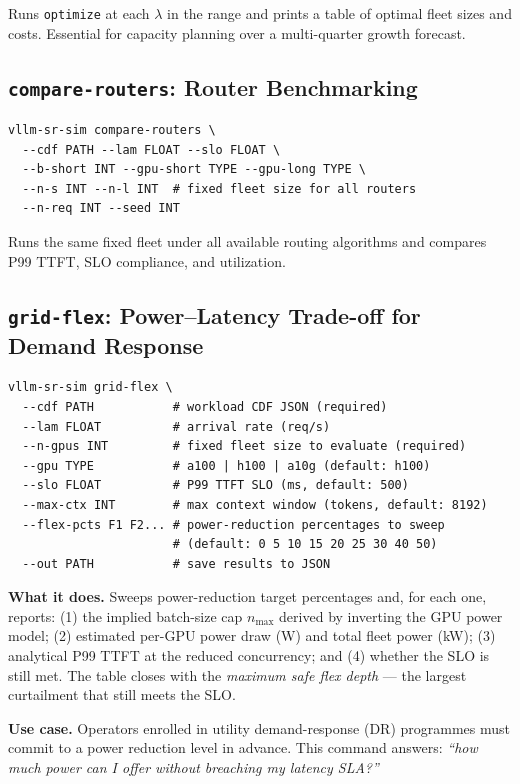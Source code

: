 \documentclass[11pt,a4paper]{article}
\begin{document}
Runs \texttt{optimize} at each $\lambda$ in the range and prints a
table of optimal fleet sizes and costs.  Essential for capacity
planning over a multi-quarter growth forecast.

\subsection{\texttt{compare-routers}: Router Benchmarking}

\begin{lstlisting}[style=shell]
vllm-sr-sim compare-routers \
  --cdf PATH --lam FLOAT --slo FLOAT \
  --b-short INT --gpu-short TYPE --gpu-long TYPE \
  --n-s INT --n-l INT  # fixed fleet size for all routers
  --n-req INT --seed INT
\end{lstlisting}

Runs the same fixed fleet under all available routing algorithms
and compares P99 TTFT, SLO compliance, and utilization.

\subsection{\texttt{grid-flex}: Power–Latency Trade-off for Demand Response}
\label{sec:cli-grid-flex}

\begin{lstlisting}[style=shell]
vllm-sr-sim grid-flex \
  --cdf PATH           # workload CDF JSON (required)
  --lam FLOAT          # arrival rate (req/s)
  --n-gpus INT         # fixed fleet size to evaluate (required)
  --gpu TYPE           # a100 | h100 | a10g (default: h100)
  --slo FLOAT          # P99 TTFT SLO (ms, default: 500)
  --max-ctx INT        # max context window (tokens, default: 8192)
  --flex-pcts F1 F2... # power-reduction percentages to sweep
                       # (default: 0 5 10 15 20 25 30 40 50)
  --out PATH           # save results to JSON
\end{lstlisting}

\textbf{What it does.}
Sweeps power-reduction target percentages and, for each one, reports:
(1) the implied batch-size cap $n_{\max}$ derived by inverting the GPU power
model; (2) estimated per-GPU power draw (W) and total fleet power (kW);
(3) analytical P99 TTFT at the reduced concurrency; and (4) whether the
SLO is still met.  The table closes with the \emph{maximum safe flex depth}
--- the largest curtailment that still meets the SLO.

\textbf{Use case.}
Operators enrolled in utility demand-response (DR) programmes must commit
to a power reduction level in advance.  This command answers: \emph{``how
much power can I offer without breaching my latency SLA?''}
\end{document}
